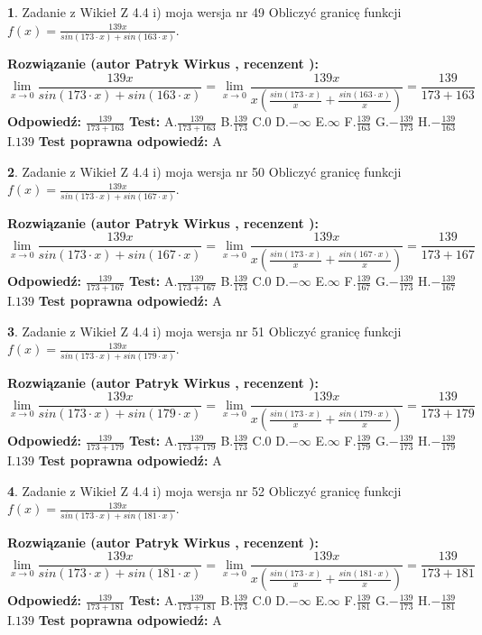 \documentclass[12pt, a4paper]{article}
\theoremstyle{definition} %
\newtheorem{zad}{}
\newcommand{\zadStart}[1]{\begin{zad}#1\newline}
\newcommand{\zadStop}{\end{zad}}
\newcommand{\rozwStart}[2]{\noindent \textbf{Rozwiązanie (autor #1 , recenzent #2): }\newline}
\newcommand{\rozwStop}{\newline}
\newcommand{\odpStart}{\noindent \textbf{Odpowiedź:}\newline}
\newcommand{\odpStop}{\newline}
\newcommand{\testStart}{\noindent \textbf{Test:}\newline}
\newcommand{\testStop}{\newline}
\newcommand{\kluczStart}{\noindent \textbf{Test poprawna odpowiedź:}\newline}
\newcommand{\kluczStop}{\newline}
\begin{document}
\zadStart{Zadanie z Wikieł Z 4.4 i) moja wersja nr 49}
Obliczyć granicę funkcji $f(x)=\frac{139x}{sin(173\cdot x) +sin(163\cdot x)}$.
\zadStop
\rozwStart{Patryk Wirkus}{}
$$\lim\limits_{x\to 0}\frac{139x}{sin(173\cdot x) +sin(163\cdot x)}=\lim\limits_{x\to 0}\frac{139x}{x(\frac{sin(173\cdot x)}{x}+\frac{sin(163\cdot x)}{x})}=\frac{139}{173+163}$$
\rozwStop
\odpStart
$\frac{139}{173+163}$
\odpStop
\testStart
A.$\frac{139}{173+163}$
B.$\frac{139}{173}$
C.$0$
D.$-\infty$
E.$\infty$
F.$\frac{139}{163}$
G.$-\frac{139}{173}$
H.$-\frac{139}{163}$
I.$139$
\testStop
\kluczStart
A
\kluczStop



\zadStart{Zadanie z Wikieł Z 4.4 i) moja wersja nr 50}
Obliczyć granicę funkcji $f(x)=\frac{139x}{sin(173\cdot x) +sin(167\cdot x)}$.
\zadStop
\rozwStart{Patryk Wirkus}{}
$$\lim\limits_{x\to 0}\frac{139x}{sin(173\cdot x) +sin(167\cdot x)}=\lim\limits_{x\to 0}\frac{139x}{x(\frac{sin(173\cdot x)}{x}+\frac{sin(167\cdot x)}{x})}=\frac{139}{173+167}$$
\rozwStop
\odpStart
$\frac{139}{173+167}$
\odpStop
\testStart
A.$\frac{139}{173+167}$
B.$\frac{139}{173}$
C.$0$
D.$-\infty$
E.$\infty$
F.$\frac{139}{167}$
G.$-\frac{139}{173}$
H.$-\frac{139}{167}$
I.$139$
\testStop
\kluczStart
A
\kluczStop



\zadStart{Zadanie z Wikieł Z 4.4 i) moja wersja nr 51}
Obliczyć granicę funkcji $f(x)=\frac{139x}{sin(173\cdot x) +sin(179\cdot x)}$.
\zadStop
\rozwStart{Patryk Wirkus}{}
$$\lim\limits_{x\to 0}\frac{139x}{sin(173\cdot x) +sin(179\cdot x)}=\lim\limits_{x\to 0}\frac{139x}{x(\frac{sin(173\cdot x)}{x}+\frac{sin(179\cdot x)}{x})}=\frac{139}{173+179}$$
\rozwStop
\odpStart
$\frac{139}{173+179}$
\odpStop
\testStart
A.$\frac{139}{173+179}$
B.$\frac{139}{173}$
C.$0$
D.$-\infty$
E.$\infty$
F.$\frac{139}{179}$
G.$-\frac{139}{173}$
H.$-\frac{139}{179}$
I.$139$
\testStop
\kluczStart
A
\kluczStop



\zadStart{Zadanie z Wikieł Z 4.4 i) moja wersja nr 52}
Obliczyć granicę funkcji $f(x)=\frac{139x}{sin(173\cdot x) +sin(181\cdot x)}$.
\zadStop
\rozwStart{Patryk Wirkus}{}
$$\lim\limits_{x\to 0}\frac{139x}{sin(173\cdot x) +sin(181\cdot x)}=\lim\limits_{x\to 0}\frac{139x}{x(\frac{sin(173\cdot x)}{x}+\frac{sin(181\cdot x)}{x})}=\frac{139}{173+181}$$
\rozwStop
\odpStart
$\frac{139}{173+181}$
\odpStop
\testStart
A.$\frac{139}{173+181}$
B.$\frac{139}{173}$
C.$0$
D.$-\infty$
E.$\infty$
F.$\frac{139}{181}$
G.$-\frac{139}{173}$
H.$-\frac{139}{181}$
I.$139$
\testStop
\kluczStart
A
\kluczStop
\end{document}
